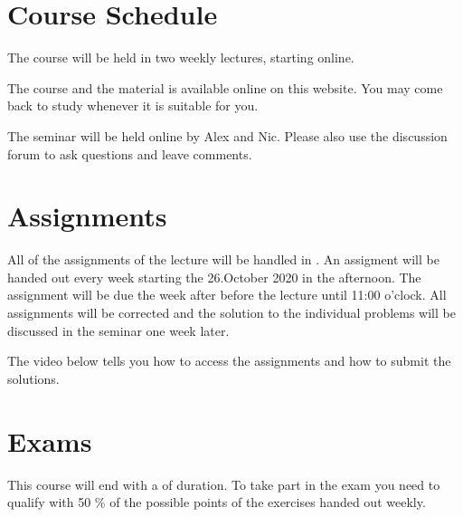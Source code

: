 \documentclass[letterpaper,10pt,english]{sphinxmanual}
\begin{document}
\section{Course Schedule}
\label{\detokenize{course-info/schedule:course-schedule}}\label{\detokenize{course-info/schedule::doc}}
The course will be held in two weekly lectures, starting  online.

\begin{DUlineblock}{0em}
\item[] 
\item[] 
\end{DUlineblock}

The course and the material is available online on this website. You may come back to study whenever it is suitable for you.

The seminar will be held online by Alex and Nic. Please also use the discussion forum to ask questions and leave comments.


\section{Assignments}
\label{\detokenize{course-info/assignments:assignments}}\label{\detokenize{course-info/assignments::doc}}
All of the assignments of the lecture will be handled in . An assigment will be handed out every week starting the 26.October 2020 in the afternoon. The assignment will be due the week after before the lecture until 11:00 o’clock. All assignments will be corrected and the solution to the individual problems will be discussed in the seminar one week later.


The video below tells you how to access the assignments and how to submit the solutions.




\section{Exams}
\label{\detokenize{course-info/exam:exams}}\label{\detokenize{course-info/exam::doc}}
This course will end with a  of  duration. To take part in the exam you need to qualify with 50 \% of the possible points of the exercises handed out weekly.
\end{document}
